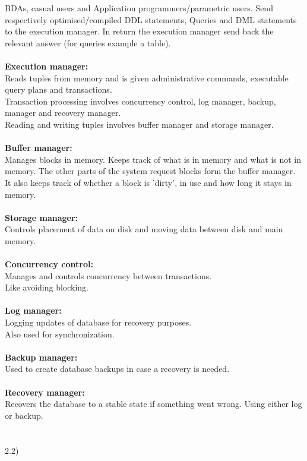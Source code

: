 \documentclass[12pt, letterpaper, twoside]{article}
\begin{document}
BDAs, casual users and Application programmers/parametric users. Send respectively optimised/compiled DDL statements, Queries and DML statements to the execution manager. In return the execution manager send back the relevant answer (for queries example a table).\\
\\
\textbf{Execution manager:}\\
Reads tuples from memory and is given administrative commands, executable query plans and transactions.\\
Transaction processing involves concurrency control, log manager, backup, manager and recovery manager.\\
Reading and writing tuples involves buffer manager and storage manager.\\ 
\\
\textbf{Buffer manager:}\\
Manages blocks in memory. Keeps track of what is in memory and what is not in memory. The other parts of the system request blocks form the buffer manager.
It also keeps track of whether a block is 'dirty', in use and how long it stays in memory.\\
\\
\textbf{Storage manager:}\\
Controls placement of data on disk and moving data between disk and main memory.\\
\\
\textbf{Concurrency control:}\\
Manages and controls concurrency between transactions.\\ Like avoiding blocking.\\
\\
\textbf{Log manager:}\\
Logging updates of database for recovery purposes.\\ Also used for synchronization.\\
\\  
\textbf{Backup manager:}\\
Used to create database backups in case a recovery is needed.\\
\ \\
\textbf{Recovery manager:}\\
Recovers the database to a stable state if something went wrong. Using either log or backup.\\
\\
\newpage
\ \\
2.2)\\
\end{document}
